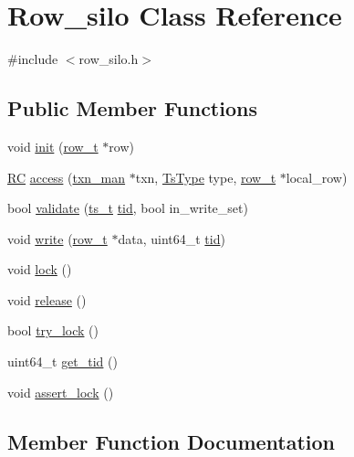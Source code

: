 \hypertarget{classRow__silo}{}\section{Row\+\_\+silo Class Reference}
\label{classRow__silo}


{\ttfamily \#include $<$row\+\_\+silo.\+h$>$}

\subsection*{Public Member Functions}
\begin{DoxyCompactItemize}
\item 
void \hyperlink{classRow__silo_aefc33cebd42cdf7901544d7e7130c704}{init} (\hyperlink{classrow__t}{row\+\_\+t} $\ast$row)
\item 
\hyperlink{global_8h_a78c49a674c810fdd03d20432f7be864a}{RC} \hyperlink{classRow__silo_a315df0688237d05a81593cf85692ca52}{access} (\hyperlink{classtxn__man}{txn\+\_\+man} $\ast$txn, \hyperlink{global_8h_a1a7f6ca1462293fe053b5ae74a6c4eda}{Ts\+Type} type, \hyperlink{classrow__t}{row\+\_\+t} $\ast$local\+\_\+row)
\item 
bool \hyperlink{classRow__silo_a8f766da80b217272f1a39cbbded2af62}{validate} (\hyperlink{global_8h_aaf095dfc9b10f757c968fe146ad7e724}{ts\+\_\+t} \hyperlink{microbench_2main_8cpp_a9ca9869868fe7e7a38a921cc7de4103f}{tid}, bool in\+\_\+write\+\_\+set)
\item 
void \hyperlink{classRow__silo_a7dfe1a018b98e8c8f32c763e3f1c033e}{write} (\hyperlink{classrow__t}{row\+\_\+t} $\ast$data, uint64\+\_\+t \hyperlink{microbench_2main_8cpp_a9ca9869868fe7e7a38a921cc7de4103f}{tid})
\item 
void \hyperlink{classRow__silo_a914b5cf2fadfb669fc3981f0d4158aa8}{lock} ()
\item 
void \hyperlink{classRow__silo_a6cba9fad4d1594f0372fa2a6e1d75055}{release} ()
\item 
bool \hyperlink{classRow__silo_ae794136e1754f843ddcbf43ed889ed21}{try\+\_\+lock} ()
\item 
uint64\+\_\+t \hyperlink{classRow__silo_a4d1732ce786a2f439c6639820bf5742a}{get\+\_\+tid} ()
\item 
void \hyperlink{classRow__silo_a4b2063bbe50907e42154ca68d86d0ab6}{assert\+\_\+lock} ()
\end{DoxyCompactItemize}


\subsection{Member Function Documentation}
\mbox{\label{classRow__silo_a315df0688237d05a81593cf85692ca52}} 
